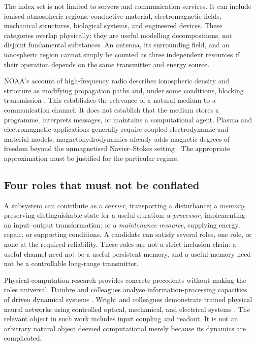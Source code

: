 \documentclass[11pt,a4paper]{article}
\theoremstyle{definition}
\theoremstyle{remark}
\begin{document}
The index set is not limited to servers and communication services. It can include ionised atmospheric regions, conductive material, electromagnetic fields, mechanical structures, biological systems, and engineered devices. These categories overlap physically; they are useful modelling decompositions, not disjoint fundamental substances. An antenna, its surrounding field, and an ionospheric region cannot simply be counted as three independent resources if their operation depends on the same transmitter and energy source.

NOAA's account of high-frequency radio describes ionospheric density and structure as modifying propagation paths and, under some conditions, blocking transmission \citep{noaa}. This establishes the relevance of a natural medium to a communication channel. It does not establish that the medium stores a programme, interprets messages, or maintains a computational agent. Plasma and electromagnetic applications generally require coupled electrodynamic and material models; magnetohydrodynamics already adds magnetic degrees of freedom beyond the unmagnetised Navier--Stokes setting \citep{lei}. The appropriate approximation must be justified for the particular regime.

\subsection{Four roles that must not be conflated}
A subsystem can contribute as a \emph{carrier}, transporting a disturbance; a \emph{memory}, preserving distinguishable state for a useful duration; a \emph{processor}, implementing an input--output transformation; or a \emph{maintenance resource}, supplying energy, repair, or supporting conditions. A candidate can satisfy several roles, one role, or none at the required reliability. These roles are not a strict inclusion chain: a useful channel need not be a useful persistent memory, and a useful memory need not be a controllable long-range transmitter.

Physical-computation research provides concrete precedents without making the roles universal. Dambre and colleagues analyse information-processing capacities of driven dynamical systems \citep{dambre}. Wright and colleagues demonstrate trained physical neural networks using controlled optical, mechanical, and electrical systems \citep{wright}. The relevant object in such work includes input coupling and readout. It is not an arbitrary natural object deemed computational merely because its dynamics are complicated.
\end{document}
